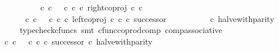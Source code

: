\begin{isabellebody}
\ {\isachardoublequoteopen}{\isachardot}{\kern0pt}{\isachardot}{\kern0pt}{\isachardot}{\kern0pt}\ {\isacharequal}{\kern0pt}\ \isanewline
\ \ \ \ \ \ \ \ {\isacharparenleft}{\kern0pt}{\isacharparenleft}{\kern0pt}{\isacharparenleft}{\kern0pt}{\isasymt}\ {\isasymcirc}\isactrlsub c\ {\isasymbeta}\isactrlbsub {\isasymnat}\isactrlsub c\isactrlesub {\isacharparenright}{\kern0pt}\ {\isasymamalg}\ {\isacharparenleft}{\kern0pt}{\isasymf}\ {\isasymcirc}\isactrlsub c\ {\isasymbeta}\isactrlbsub {\isasymnat}\isactrlsub c\isactrlesub {\isacharparenright}{\kern0pt}\ {\isasymcirc}\isactrlsub c\ right{\isacharunderscore}{\kern0pt}coproj\ {\isasymnat}\isactrlsub c\ {\isasymnat}\isactrlsub c{\isacharparenright}{\kern0pt}\isanewline
\ \ \ \ \ \ \ \ \ \ {\isasymamalg}\ \isanewline
\ \ \ \ \ \ \ \ {\isacharparenleft}{\kern0pt}{\isacharparenleft}{\kern0pt}{\isasymt}\ {\isasymcirc}\isactrlsub c\ {\isasymbeta}\isactrlbsub {\isasymnat}\isactrlsub c\isactrlesub {\isacharparenright}{\kern0pt}\ {\isasymamalg}\ {\isacharparenleft}{\kern0pt}{\isasymf}\ {\isasymcirc}\isactrlsub c\ {\isasymbeta}\isactrlbsub {\isasymnat}\isactrlsub c\isactrlesub {\isacharparenright}{\kern0pt}\ {\isasymcirc}\isactrlsub c\ left{\isacharunderscore}{\kern0pt}coproj\ {\isasymnat}\isactrlsub c\ {\isasymnat}\isactrlsub c\ {\isasymcirc}\isactrlsub c\ successor{\isacharparenright}{\kern0pt}{\isacharparenright}{\kern0pt}\isanewline
\ \ \ \ \ \ \ \ \ \ {\isasymcirc}\isactrlsub c\ halve{\isacharunderscore}{\kern0pt}with{\isacharunderscore}{\kern0pt}parity{\isachardoublequoteclose}\isanewline
\ \ \ \ \ \ \isamarkupfalse%
\ {\isacharparenleft}{\kern0pt}typecheck{\isacharunderscore}{\kern0pt}cfuncs{\isacharcomma}{\kern0pt}\ smt\ cfunc{\isacharunderscore}{\kern0pt}coprod{\isacharunderscore}{\kern0pt}comp\ comp{\isacharunderscore}{\kern0pt}associative{}{\isacharparenright}{\kern0pt}\isanewline
\ \ \ \ \isamarkupfalse%
\ \isamarkupfalse%
\ {\isachardoublequoteopen}{\isachardot}{\kern0pt}{\isachardot}{\kern0pt}{\isachardot}{\kern0pt}\ {\isacharequal}{\kern0pt}\ {\isacharparenleft}{\kern0pt}{\isacharparenleft}{\kern0pt}{\isasymf}\ {\isasymcirc}\isactrlsub c\ {\isasymbeta}\isactrlbsub {\isasymnat}\isactrlsub c\isactrlesub {\isacharparenright}{\kern0pt}\ {\isasymamalg}\ {\isacharparenleft}{\kern0pt}{\isasymt}\ {\isasymcirc}\isactrlsub c\ {\isasymbeta}\isactrlbsub {\isasymnat}\isactrlsub c\isactrlesub \ {\isasymcirc}\isactrlsub c\ successor{\isacharparenright}{\kern0pt}{\isacharparenright}{\kern0pt}\ {\isasymcirc}\isactrlsub c\ halve{\isacharunderscore}{\kern0pt}with{\isacharunderscore}{\kern0pt}parity{\isachardoublequoteclose}\isanewline

\end{isabellebody}
